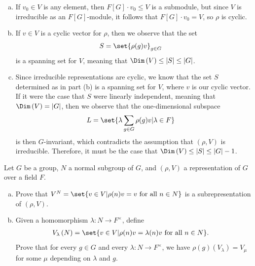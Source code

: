 \documentclass[10pt]{mypackage}
\begin{document}
\begin{solution}\hfill
  \begin{enumerate}[(a)]
    \item If $v_0\in V$ is any element, then $F[G]\cdot v_0\leq V$ is a submodule, but since $V$ is irreducible as an $F[G]$-module, it follows that $F[G]\cdot v_0 = V$, so $\rho$ is cyclic.
    \item If $v\in V$ is a cyclic vector for $\rho$, then we observe that the set
      \begin{align*}
        S &= \set{\rho(g)v}_{g\in G}
      \end{align*}
      is a spanning set for $V$, meaning that $\Dim\left( V \right)\leq \left\vert S \right\vert\leq \left\vert G \right\vert$.
    \item Since irreducible representations are cyclic, we know that the set $S$ determined as in part (b) is a spanning set for $V$, where $v$ is our cyclic vector. If it were the case that $S$ were linearly independent, meaning that $\Dim\left( V \right) = \left\vert G \right\vert$, then we observe that the one-dimensional subspace
      \begin{align*}
        L &= \set{\lambda \sum_{g\in G} \rho(g)v | \lambda\in F}
      \end{align*}
      is then $G$-invariant, which contradicts the assumption that $\left( \rho,V \right)$ is irreducible. Therefore, it must be the case that $\Dim\left( V \right)\leq \left\vert S \right\vert\leq \left\vert G \right\vert-1$.
  \end{enumerate}
\end{solution}
\begin{problem}[Problem 6]
  Let $G$ be a group, $N$ a normal subgroup of $G$, and $\left( \rho,V \right)$ a representation of $G$ over a field $F$.
  \begin{enumerate}[(a)]
    \item Prove that $V^{N} = \set{v\in V | \rho(n)v = v\text{ for all }n\in N}$ is a subrepresentation of $\left( \rho,V \right)$.
    \item Given a homomorphism $\lambda\colon N\rightarrow F^{\times}$, define
      \begin{align*}
        V_{\lambda}\left( N \right) &= \set{v\in V | \rho(n)v = \lambda(n)v\text{ for all }n\in N}.
      \end{align*}
      Prove that for every $g\in G$ and every $\lambda\colon N\rightarrow F^{\times}$, we have $\rho(g)\left( V_{\lambda} \right) = V_{\mu}$ for some $\mu$ depending on $\lambda$ and $g$.
  \end{enumerate}
\end{problem}
\end{document}
